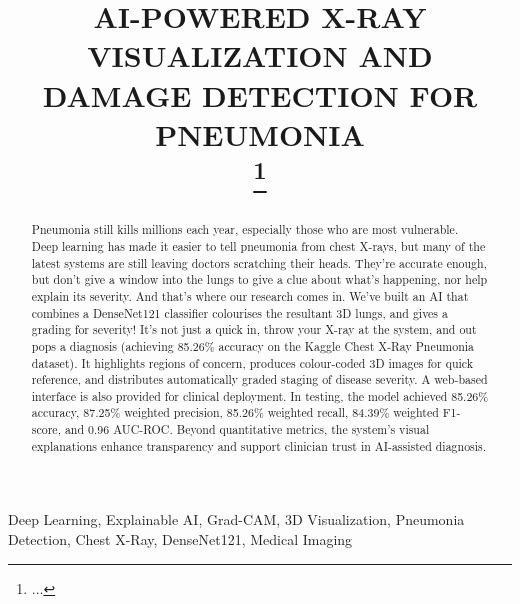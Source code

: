\documentclass[conference]{IEEEtran}
\begin{document}
\title{AI-POWERED X-RAY VISUALIZATION AND DAMAGE DETECTION FOR PNEUMONIA\\
{\footnotesize \textsuperscript{}}
\thanks{...}
}
\author{
\and
{}
\and
{}
}
\maketitle
\begin{abstract}
Pneumonia still kills millions each year, especially those who are most vulnerable. Deep learning has made it easier to tell pneumonia from chest X-rays, but many of the latest systems are still leaving doctors scratching their heads. They're accurate enough, but don't give a window into the lungs to give a clue about what's happening, nor help explain its severity. And that's where our research comes in. We've built an AI that combines a DenseNet121 classifier colourises the resultant 3D lungs, and gives a grading for severity! It's not just a quick in, throw your X-ray at the system, and out pops a diagnosis (achieving 85.26\% accuracy on the Kaggle Chest X-Ray Pneumonia dataset). It highlights regions of concern, produces colour-coded 3D images for quick reference, and distributes automatically graded staging of disease severity. A web-based interface is also provided for clinical deployment. In testing, the model achieved 85.26\% accuracy, 87.25\% weighted precision, 85.26\% weighted recall, 84.39\% weighted F1-score, and 0.96 AUC-ROC. Beyond quantitative metrics, the system's visual explanations enhance transparency and support clinician trust in AI-assisted diagnosis.
\end{abstract}
\begin{IEEEkeywords}
Deep Learning, Explainable AI, Grad-CAM, 3D Visualization, Pneumonia Detection, Chest X-Ray, DenseNet121, Medical Imaging
\end{IEEEkeywords}
\end{document}
